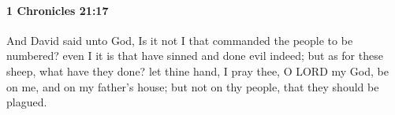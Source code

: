 
		\paragraph{1 Chronicles 21:17} %
			\label{1CHRONICLES-21-17}

			And David said unto God, Is it not I that commanded the people to be numbered? even I it is that have sinned and done evil indeed; but as for these sheep, what have they done? let thine hand, I pray thee, O LORD my God, be on me, and on my father’s house; but not on thy people, that they should be plagued.


